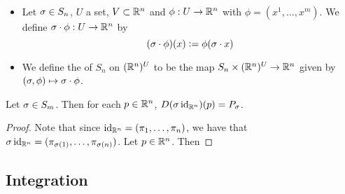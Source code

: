 \documentclass{book}
\begin{document}
	\begin{defn}  \
		\begin{itemize} 
			\item Let $\sigma \in S_n$, $U$ a set, $V \subset \mathbb{R}^n$ and $\phi: U \rightarrow \mathbb{R}^n$ with $\phi = (x^1, \ldots, x^m)$. We define $\sigma \cdot \phi: U \rightarrow \mathbb{R}^n$ by 
			$$(\sigma \cdot \phi)(x) \vcentcolon= \phi (\sigma \cdot x) $$
			\item We define the  of $S_n$ on $(\mathbb{R}^n)^{U}$ to be the map $S_n \times (\mathbb{R}^n)^{U} \rightarrow \mathbb{R}^n$ given by $(\sigma, \phi) \mapsto \sigma \cdot \phi$.
		\end{itemize}
	\end{defn}
	
	\begin{ex} 
		Let $\sigma \in S_m$. Then for each $p \in \mathbb{R}^n$, $D(\sigma \operatorname{id}_{\mathbb{R}^n})(p) = P_{\sigma}$. 
	\end{ex}
	
	\begin{proof}
		Note that since $\operatorname{id}_{\mathbb{R}^n} = (\pi_1, \ldots, \pi_n)$, we have that $\sigma \operatorname{id}_{\mathbb{R}^n} = (\pi_{\sigma(1)}, \ldots, \pi_{\sigma(n)})$. Let $p \in \mathbb{R}^n$. Then 
		
	\end{proof}
	
	
	
	
	
	
	
	
	
	
	
	
	
	
	
	
	
	
	
	
	
	
	
	
	
	
	
	
	
	
	
	
	
	
	
	
	
	
	
	
	
	
	
	
	
	
	
	
	\newpage
	
	\subsection{Integration}
\end{document}
